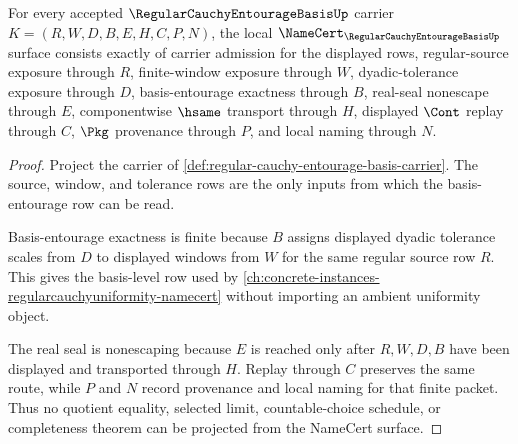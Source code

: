 \begin{theorem}
\label{thm:regular-cauchy-entourage-basis-namecert-obligations}
For every accepted $\RegularCauchyEntourageBasisUp$ carrier $K=(R,W,D,B,E,H,C,P,N)$, the local $\NameCert_{\RegularCauchyEntourageBasisUp}$ surface consists exactly of carrier admission for the displayed rows, regular-source exposure through $R$, finite-window exposure through $W$, dyadic-tolerance exposure through $D$, basis-entourage exactness through $B$, real-seal nonescape through $E$, componentwise $\hsame$ transport through $H$, displayed $\Cont$ replay through $C$, $\Pkg$ provenance through $P$, and local naming through $N$.
\end{theorem}
\begin{proof}
Project the carrier of \autoref{def:regular-cauchy-entourage-basis-carrier}. The source, window, and tolerance rows are the only inputs from which the basis-entourage row can be read.

Basis-entourage exactness is finite because $B$ assigns displayed dyadic tolerance scales from $D$ to displayed windows from $W$ for the same regular source row $R$. This gives the basis-level row used by \autoref{ch:concrete-instances-regularcauchyuniformity-namecert} without importing an ambient uniformity object.

The real seal is nonescaping because $E$ is reached only after $R,W,D,B$ have been displayed and transported through $H$. Replay through $C$ preserves the same route, while $P$ and $N$ record provenance and local naming for that finite packet. Thus no quotient equality, selected limit, countable-choice schedule, or completeness theorem can be projected from the NameCert surface.
\end{proof}

